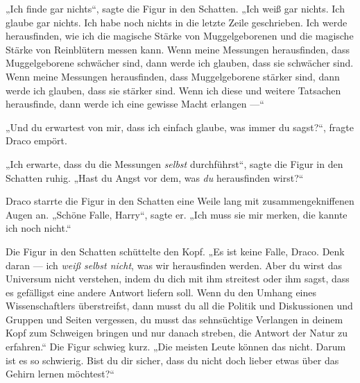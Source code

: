 „Ich finde gar nichts“, sagte die Figur in den Schatten.
„Ich weiß gar nichts. Ich glaube gar nichts. Ich habe noch nichts in die letzte Zeile geschrieben. Ich werde herausfinden, wie ich die magische Stärke von Muggelgeborenen und die magische Stärke von Reinblütern messen kann. Wenn meine Messungen herausfinden, dass Muggelgeborene schwächer sind, dann werde ich glauben, dass sie schwächer sind. Wenn meine Messungen herausfinden, dass Muggelgeborene stärker sind, dann werde ich glauben, dass sie stärker sind. Wenn ich diese und weitere Tatsachen herausfinde, dann werde ich eine gewisse Macht erlangen —“

„Und du erwartest von mir, dass ich einfach glaube, was immer du sagst?“, fragte Draco empört.

„Ich erwarte, dass du die Messungen \emph{selbst} durchführst“, sagte die Figur in den Schatten ruhig.
„Hast du Angst vor dem, was \emph{du} herausfinden wirst?“

Draco starrte die Figur in den Schatten eine Weile lang mit zusammengekniffenen Augen an.
„Schöne Falle, Harry“, sagte er.
„Ich muss sie mir merken, die kannte ich noch nicht.“

Die Figur in den Schatten schüttelte den Kopf.
„Es ist keine Falle, Draco. Denk daran — ich \emph{weiß selbst nicht}, was wir herausfinden werden. Aber du wirst das Universum nicht verstehen, indem du dich mit ihm streitest oder ihm sagst, dass es gefälligst eine andere Antwort liefern soll. Wenn du den Umhang eines Wissenschaftlers überstreifst, dann musst du all die Politik und Diskussionen und Gruppen und Seiten vergessen, du musst das sehnsüchtige Verlangen in deinem Kopf zum Schweigen bringen und nur danach streben, die Antwort der Natur zu erfahren.“ Die Figur schwieg kurz.
„Die meisten Leute können das nicht. Darum ist es so schwierig. Bist du dir sicher, dass du nicht doch lieber etwas über das Gehirn lernen möchtest?“

